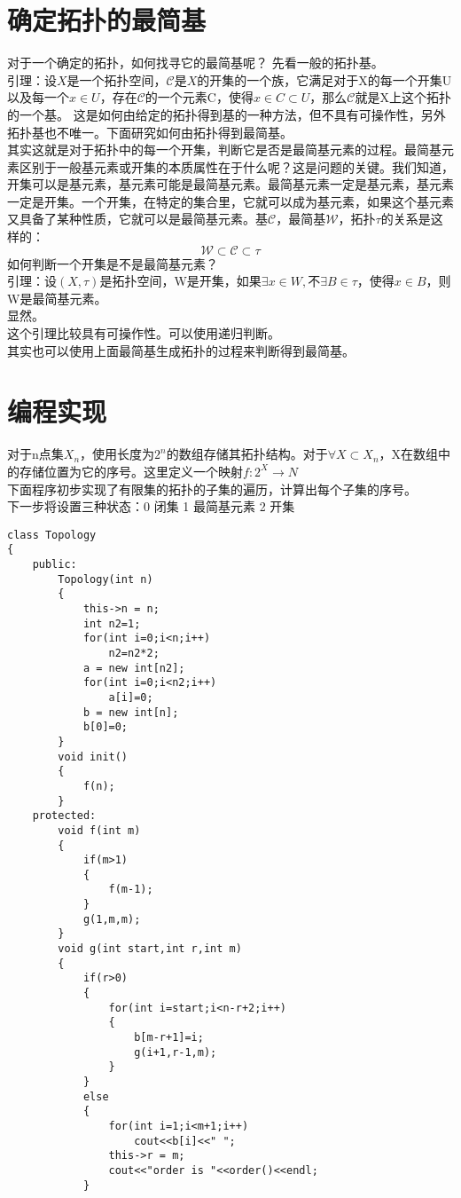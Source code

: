 \documentclass[a4paper,12pt]{article}
\begin{document}
\begin{CJK*}{UTF8}{gbsn}
	\section{确定拓扑的最简基}
	对于一个确定的拓扑，如何找寻它的最简基呢？
	先看一般的拓扑基。\\
	引理：设$X$是一个拓扑空间，$\mathcal{C}$是$X$的开集的一个族，它满足对于X的每一个开集U以及每一个$x\in U$，存在$\mathcal{C}$的一个元素C，使得$x\in C\subset U$，那么$\mathcal{C}$就是X上这个拓扑的一个基。
	这是如何由给定的拓扑得到基的一种方法，但不具有可操作性，另外拓扑基也不唯一。下面研究如何由拓扑得到最简基。\\
	其实这就是对于拓扑中的每一个开集，判断它是否是最简基元素的过程。最简基元素区别于一般基元素或开集的本质属性在于什么呢？这是问题的关键。我们知道，开集可以是基元素，基元素可能是最简基元素。最简基元素一定是基元素，基元素一定是开集。一个开集，在特定的集合里，它就可以成为基元素，如果这个基元素又具备了某种性质，它就可以是最简基元素。基$\mathcal{C}$，最简基$\mathcal{W}$，拓扑$\tau$的关系是这样的：
	$$\mathcal{W} \subset \mathcal{C} \subset \tau$$
	如何判断一个开集是不是最简基元素？\\
	引理：设$(X,\tau)$是拓扑空间，W是开集，如果$\exists x \in W,$不$\exists B \in \tau$，使得$x\in B$，则W是最简基元素。\\
	显然。\\
	这个引理比较具有可操作性。可以使用递归判断。\\
	其实也可以使用上面最简基生成拓扑的过程来判断得到最简基。\\
	\section{编程实现}
	对于n点集$X_n$，使用长度为$2^n$的数组存储其拓扑结构。对于$\forall X\subset X_n$，X在数组中的存储位置为它的序号。这里定义一个映射$f:2^X \rightarrow N$\\
	下面程序初步实现了有限集的拓扑的子集的遍历，计算出每个子集的序号。\\
	下一步将设置三种状态：0 闭集 1 最简基元素 2 开集\\
	\lstset{language=C++}
	\lstset{breaklines}
	\begin{lstlisting}
class Topology
{
    public:
        Topology(int n)
        {
            this->n = n;
            int n2=1;
            for(int i=0;i<n;i++)
                n2=n2*2;
            a = new int[n2];
            for(int i=0;i<n2;i++)
                a[i]=0;
            b = new int[n];
            b[0]=0;
        }
        void init()
        {
            f(n);
        }
    protected:
        void f(int m)
        {
            if(m>1)
            {
                f(m-1);
            }
            g(1,m,m);
        }
        void g(int start,int r,int m)
        {
            if(r>0)
            {
                for(int i=start;i<n-r+2;i++)
                {
                    b[m-r+1]=i;
                    g(i+1,r-1,m);
                }
            }
            else
            {
                for(int i=1;i<m+1;i++)
                    cout<<b[i]<<" ";
                this->r = m;
                cout<<"order is "<<order()<<endl;
            }


\end{lstlisting}
\end{CJK*}
\end{document}
